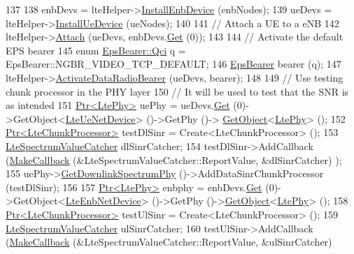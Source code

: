 \begin{DoxyCode}
137 
138   enbDevs = lteHelper->\hyperlink{classns3_1_1LteHelper_a5e009ad35ef85f46b5a6099263f15a03}{InstallEnbDevice} (enbNodes);
139   ueDevs = lteHelper->\hyperlink{classns3_1_1LteHelper_ac9cd932d7de92811cfa953c2e3b2fc9f}{InstallUeDevice} (ueNodes);
140 
141   \textcolor{comment}{// Attach a UE to a eNB}
142   lteHelper->\hyperlink{classns3_1_1LteHelper_a9466743f826aa2652a87907b7f0a1c87}{Attach} (ueDevs, enbDevs.\hyperlink{classns3_1_1NetDeviceContainer_a677d62594b5c9d2dea155cc5045f4d0b}{Get} (0));
143 
144   \textcolor{comment}{// Activate the default EPS bearer}
145   \textcolor{keyword}{enum} \hyperlink{structns3_1_1EpsBearer_aecf0c67109c5eb4ec0b07226fff5885e}{EpsBearer::Qci} q = EpsBearer::NGBR\_VIDEO\_TCP\_DEFAULT;
146   \hyperlink{structns3_1_1EpsBearer}{EpsBearer} bearer (q);
147   lteHelper->\hyperlink{classns3_1_1LteHelper_ac896e16cf162e4beeaa292d39ab1b700}{ActivateDataRadioBearer} (ueDevs, bearer);
148 
149   \textcolor{comment}{// Use testing chunk processor in the PHY layer}
150   \textcolor{comment}{// It will be used to test that the SNR is as intended}
151   \hyperlink{classns3_1_1Ptr}{Ptr<LtePhy>} uePhy = ueDevs.\hyperlink{classns3_1_1NetDeviceContainer_a677d62594b5c9d2dea155cc5045f4d0b}{Get} (0)->GetObject<\hyperlink{classns3_1_1LteUeNetDevice}{LteUeNetDevice}> ()->GetPhy ()->
      \hyperlink{classns3_1_1Object_a13e18c00017096c8381eb651d5bd0783}{GetObject}<\hyperlink{classns3_1_1LtePhy}{LtePhy}> ();
152   \hyperlink{classns3_1_1Ptr}{Ptr<LteChunkProcessor>} testDlSinr = Create<LteChunkProcessor> ();
153   \hyperlink{classns3_1_1LteSpectrumValueCatcher}{LteSpectrumValueCatcher} dlSinrCatcher;
154   testDlSinr->AddCallback (\hyperlink{group__makecallbackmemptr_ga9376283685aa99d204048d6a4b7610a4}{MakeCallback} (&LteSpectrumValueCatcher::ReportValue, &dlSinrCatcher)
      );
155   uePhy->\hyperlink{classns3_1_1LtePhy_a9560f8862545c7c5760e7f6737c5b938}{GetDownlinkSpectrumPhy} ()->AddDataSinrChunkProcessor (testDlSinr);
156 
157   \hyperlink{classns3_1_1Ptr}{Ptr<LtePhy>} enbphy = enbDevs.\hyperlink{classns3_1_1NetDeviceContainer_a677d62594b5c9d2dea155cc5045f4d0b}{Get} (0)->GetObject<\hyperlink{classns3_1_1LteEnbNetDevice}{LteEnbNetDevice}> ()->GetPhy 
      ()->\hyperlink{classns3_1_1Object_a13e18c00017096c8381eb651d5bd0783}{GetObject}<\hyperlink{classns3_1_1LtePhy}{LtePhy}> ();
158   \hyperlink{classns3_1_1Ptr}{Ptr<LteChunkProcessor>} testUlSinr = Create<LteChunkProcessor> ();
159   \hyperlink{classns3_1_1LteSpectrumValueCatcher}{LteSpectrumValueCatcher} ulSinrCatcher;
160   testUlSinr->AddCallback (\hyperlink{group__makecallbackmemptr_ga9376283685aa99d204048d6a4b7610a4}{MakeCallback} (&LteSpectrumValueCatcher::ReportValue, &ulSinrCatcher)

\end{DoxyCode}
